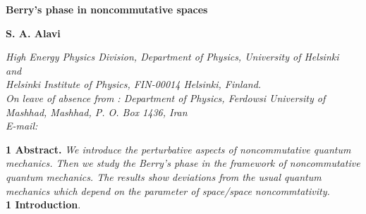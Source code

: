 \documentclass[a4paper,a4paper]{article}
\begin{document}
\begin{center}
{\LARGE \bf Berry's phase in noncommutative  spaces }
\end{center}
\vspace{2.cm}
\begin{center}
{\LARGE\bf S. A. Alavi}
\end{center}
\begin{center}
\textit{High Energy Physics Division, Department of Physics,
University of
Helsinki\\
and\\
Helsinki Institute of Physics, FIN-00014 Helsinki, Finland.\\
On leave of absence from : Department of Physics, Ferdowsi
University of
Mashhad, Mashhad, P. O. Box 1436, Iran\\
E-mail: \coordHE{}\\
\coordHE{}}
\end{center}

\textbf{1 Abstract.} \textsl{We introduce the perturbative aspects
of noncommutative quantum mechanics. Then we study the Berry's
phase in the framework of noncommutative quantum mechanics.
The results show deviations from the usual quantum mechanics which depend on
the parameter of space/space noncommtativity.}\\



\textbf{1 Introduction}.\\
\end{document}
